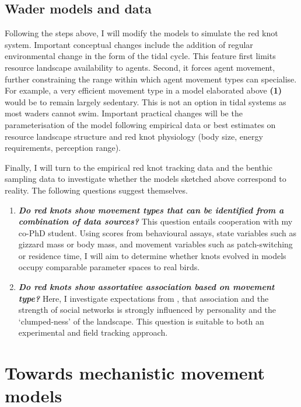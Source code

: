 \section{Wader models and data}

Following the steps above, I will modify the models to simulate the red knot system. Important conceptual changes include the addition of regular environmental change in the form of the tidal cycle. This feature first limits resource landscape availability to agents. Second, it forces agent movement, further constraining the range within which agent movement types can specialise. For example, a very efficient movement type in a model elaborated above \textbf{(1)} would be to remain largely sedentary. This is not an option in tidal systems as most waders cannot swim. Important practical changes will be the parameterisation of the model following empirical data or best estimates on resource landscape structure and red knot physiology (body size, energy requirements, perception range).

Finally, I will turn to the empirical red knot tracking data and the benthic sampling data to investigate whether the models sketched above correspond to reality. The following questions suggest themselves.

\begin{enumerate}
\def\labelenumi{\arabic{enumi}.}
\setcounter{enumi}{3}
\item
  \textbf{\emph{Do red knots show movement types that can be identified
  from a combination of data sources?}} This question entails
  cooperation with my co-PhD student. Using scores from behavioural
  assays, state variables such as gizzard mass or body mass, and
  movement variables such as patch-switching or residence time, I will
  aim to determine whether knots evolved in models occupy comparable
  parameter spaces to real birds.
  
\item
  \textbf{\emph{Do red knots show assortative association based on
  movement type?}} Here, I investigate expectations from
  \citet{spiegel2017}, that association and the strength of social
  networks is strongly influenced by personality and the `clumped-ness'
  of the landscape. This question is suitable to both an experimental
  and field tracking approach.
\end{enumerate}

\chapter{Towards mechanistic movement models}

